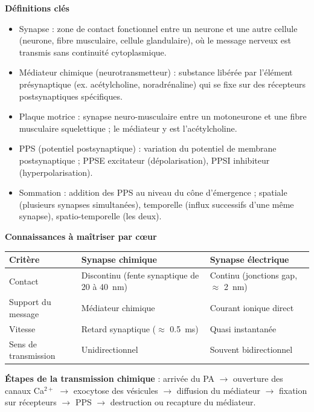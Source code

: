 \documentclass[11pt]{article}
\newcommand{\cle}[1]{{\popxbold\color{popdark}#1}}
\begin{document}
\begin{bilan}
\textbf{Définitions clés}
\begin{itemize}
  \item \cle{Synapse} : zone de contact fonctionnel entre un neurone et une autre cellule (neurone, fibre musculaire, cellule glandulaire), où le message nerveux est transmis sans continuité cytoplasmique.
  \item \cle{Médiateur chimique} (neurotransmetteur) : substance libérée par l'élément présynaptique (ex. acétylcholine, noradrénaline) qui se fixe sur des récepteurs postsynaptiques spécifiques.
  \item \cle{Plaque motrice} : synapse neuro-musculaire entre un motoneurone et une fibre musculaire squelettique ; le médiateur y est l'acétylcholine.
  \item \cle{PPS} (potentiel postsynaptique) : variation du potentiel de membrane postsynaptique ; \cle{PPSE} excitateur (dépolarisation), \cle{PPSI} inhibiteur (hyperpolarisation).
  \item \cle{Sommation} : addition des PPS au niveau du cône d'émergence ; spatiale (plusieurs synapses simultanées), temporelle (influx successifs d'une même synapse), spatio-temporelle (les deux).
\end{itemize}

\textbf{Connaissances à maîtriser par cœur}
\begin{center}
\begin{tabularx}{\linewidth}{|l|X|X|}
\hline
\rowcolor{popblueL} \textbf{Critère} & \textbf{Synapse chimique} & \textbf{Synapse électrique} \\
\hline
Contact & Discontinu (fente synaptique de 20 à \SI{40}{nm}) & Continu (jonctions gap, $\approx$ \SI{2}{nm}) \\
\hline
Support du message & Médiateur chimique & Courant ionique direct \\
\hline
Vitesse & Retard synaptique ($\approx$ \SI{0,5}{ms}) & Quasi instantanée \\
\hline
Sens de transmission & Unidirectionnel & Souvent bidirectionnel \\
\hline
\end{tabularx}
\end{center}

\textbf{Étapes de la transmission chimique} : arrivée du PA $\rightarrow$ ouverture des canaux Ca$^{2+}$ $\rightarrow$ exocytose des vésicules $\rightarrow$ diffusion du médiateur $\rightarrow$ fixation sur récepteurs $\rightarrow$ PPS $\rightarrow$ destruction ou recapture du médiateur.


\end{bilan}
\end{document}
